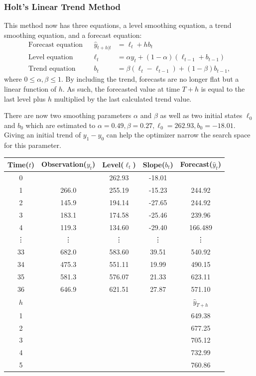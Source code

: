 \documentclass{article}
\begin{document}
  \subsubsection*{Holt's Linear Trend Method}
  This method now has three equations, a level smoothing equation, a trend smoothing equation, and a forecast equation:
  \begin{align*}
    \text{Forecast equation} && \hat{y}_{t+h|t} &= \ell_{t} + hb_{t} \\
    \text{Level equation}   && \ell_{t} &= \alpha y_{t} + (1 - \alpha)(\ell_{t-1} + b_{t-1})\\
    \text{Trend equation}   && b_{t}    &= \beta(\ell_{t} - \ell_{t-1}) + (1 -\beta)b_{t-1},
  \end{align*}
  where $0 \le \alpha, \beta \le 1$. By including the trend, forecasts are no longer flat but a linear function of $h$. As such, the forecasted value at time $T+h$ is equal to the last level plus $h$ multiplied by the last calculated trend value.

  There are now two smoothing parameters $\alpha$ and $\beta$ as well as two initial states $\ell_0$ and $b_0$ which are estimated to $\alpha=0.49, \beta=0.27, \ell_0=262.93, b_0=-18.01$. Giving an initial trend of $y_1-y_0$ can help the optimizer narrow the search space for this parameter.

  \begin{center}
    \begin{tabular}{||c c c c c||} 
     \hline
     Time($t$) & Observation($y_t$) & Level($\ell_t$) & Slope($b_t$) & Forecast($\hat{y}_t$) \\ [0.5ex] 
     \hline
     0 &       & 262.93 & -18.01 &  \\ 
     \hline
     1 & 266.0 & 255.19 & -15.23 & 244.92 \\
     \hline
     2 & 145.9 & 194.14 & -27.65 & 244.92 \\
     \hline
     3 & 183.1 & 174.58 & -25.46 & 239.96 \\
     \hline
     4 & 119.3 & 134.60 & -29.40 & 166.489 \\
     \hline
     \vdots & \vdots & \vdots & \vdots & \vdots \\
     \hline
     33 & 682.0 & 583.60 & 39.51 & 540.92 \\
     \hline
     34 & 475.3 & 551.11 & 19.99 & 490.15 \\
     \hline
     35 & 581.3 & 576.07 & 21.33 & 623.11 \\
     \hline
     36 & 646.9 & 621.51 & 27.87 & 571.10 \\
     \hline
     $h$ &  &  &  & $\hat{y}_{T+h}$ \\
     \hline
     1 &  &  &  & 649.38 \\
     \hline
     2 &  &  &  & 677.25 \\
     \hline
     3 &  &  &  & 705.12 \\
     \hline
     4 &  &  &  & 732.99 \\
     \hline
     5 &  &  &  & 760.86 \\
     \hline
    \end{tabular}
  \end{center}
\end{document}
